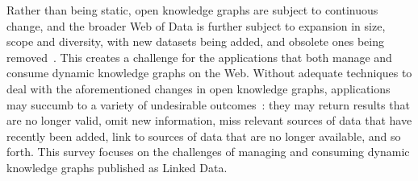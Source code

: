 \documentclass[sw]{iosart2x}
\begin{document}


\medskip

Rather than being static, open knowledge graphs are subject to continuous change, and the broader Web of Data is further subject to expansion in size, scope and diversity, with new datasets being added, and obsolete ones being removed~\cite{UmbrichHHPD10, AuerDML12, KaferAUOH13, DividinoSGG13, SchmachtenbergBP14}. This creates a challenge for the applications that both manage and consume dynamic knowledge graphs on the Web. Without adequate techniques to deal with the aforementioned changes in open knowledge graphs, applications may succumb to a variety of undesirable outcomes~\cite{MeimarisPPGS14}: they may return results that are no longer valid, omit new information, miss relevant sources of data that have recently been added, link to sources of data that are no longer available, and so forth. This survey focuses on the challenges of managing and consuming dynamic knowledge graphs published as Linked Data.
\medskip

\end{document}
